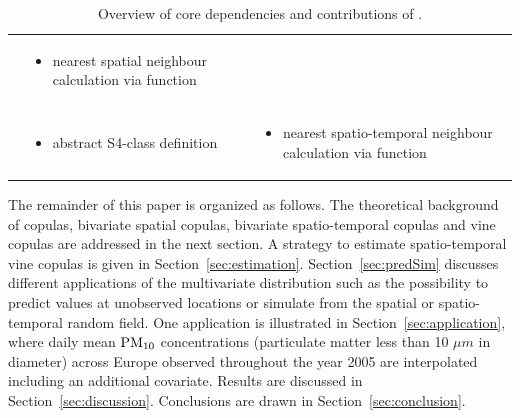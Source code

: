 \documentclass[article,nojss]{jss}
\begin{document}
\begin{table}
\begin{tabular}{l|L{0.35\textwidth} L{0.45\textwidth}}
\begin{itemize}[leftmargin=*, noitemsep, nosep]
\end{itemize} & 
\begin{itemize}[leftmargin=*, noitemsep, nosep]\vspace{-\baselineskip}
\item nearest spatial neighbour calculation via function \vspace{-0.9\baselineskip}
\end{itemize} \\
 &
\begin{itemize}[leftmargin=*, noitemsep, nosep]\vspace{-\baselineskip}
\item abstract S4-class definition \vspace{-0.9\baselineskip}
\end{itemize} & 
\begin{itemize}[leftmargin=*, noitemsep, nosep]\vspace{-\baselineskip}
\item nearest spatio-temporal neighbour calculation via function \vspace{-0.9\baselineskip}
\end{itemize}
\end{tabular}
\caption{Overview of core dependencies and contributions of .\label{tab:contribution}}
\end{table}

The remainder of this paper is organized as follows. The theoretical background of copulas, bivariate spatial copulas, bivariate spatio-temporal copulas and vine copulas are addressed in the next section. A strategy to estimate spatio-temporal vine copulas is given in Section~\ref{sec:estimation}. Section~\ref{sec:predSim} discusses different applications of the multivariate distribution such as the possibility to predict values at unobserved locations or simulate from the spatial or spatio-temporal random field. One application is illustrated in Section~\ref{sec:application}, where daily mean $\rm{PM}_{10}$ concentrations (particulate matter less than 10 $\mu m$ in diameter) across Europe observed throughout the year 2005 are interpolated including an additional covariate. Results are discussed in Section~\ref{sec:discussion}. Conclusions are drawn in Section~\ref{sec:conclusion}.

\newpage
\end{document}
